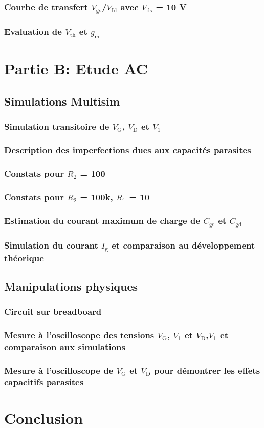 \documentclass[french,10pt,a4paper]{article}
\begin{document}
			\subsubsection{Courbe de transfert $V_\text{gs}$/$V_\text{Id}$ avec $V_\text{ds}$ = 10 V}
			\subsubsection{Evaluation de $V_\text{th}$ et $g_\text{m}$}
		
	
	\section{Partie B: Etude AC}
		\subsection{Simulations Multisim}
			\subsubsection{Simulation transitoire de $V_\text{G}$, $V_\text{D}$ et $V_\text{1}$}
			\subsubsection{Description des imperfections dues aux capacités parasites}
			\subsubsection{Constats pour $R_\text{2}$ = 100}
			\subsubsection{Constats pour $R_\text{2}$ = 100k, $R_\text{1}$ = 10}
			\subsubsection{Estimation du courant maximum de charge de $C_{\text{gs}}$ et $C_{\text{gd}}$}
			\subsubsection{Simulation du courant $I_\text{g}$ et comparaison au développement théorique} 
		\subsection{Manipulations physiques}
			\subsubsection{Circuit sur breadboard}
			\subsubsection{Mesure à l'oscilloscope des tensions $V_\text{G}$, $V_\text{1}$ et $V_\text{D}$,$V_\text{1}$ et comparaison aux simulations}
			\subsubsection{Mesure à l'oscilloscope de $V_\text{G}$ et $V_\text{D}$ pour démontrer les effets capacitifs parasites}

		
	\section{Conclusion}
		
\end{document}

